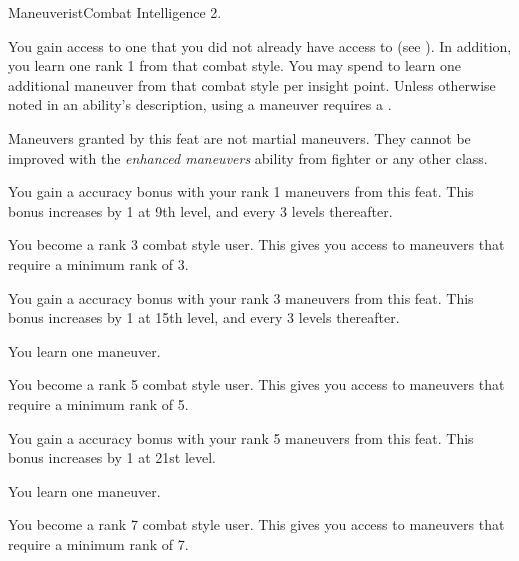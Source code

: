     \begin{feat}{Maneuverist}{Combat}
        \featpre Intelligence 2.

         You gain access to one  that you did not already have access to (see ).
        In addition, you learn one rank 1  from that combat style.
        You may spend  to learn one additional maneuver from that combat style per insight point.
        Unless otherwise noted in an ability's description, using a maneuver requires a .

        Maneuvers granted by this feat are not martial maneuvers.
        They cannot be improved with the \textit{enhanced maneuvers} ability from fighter or any other class.

         You gain a  accuracy bonus with your rank 1 maneuvers from this feat.
        This bonus increases by 1 at 9th level, and every 3 levels thereafter.

         You become a rank 3 combat style user.
        This gives you access to maneuvers that require a minimum rank of 3.

         You gain a  accuracy bonus with your rank 3 maneuvers from this feat.
        This bonus increases by 1 at 15th level, and every 3 levels thereafter.

         You learn one maneuver.

         You become a rank 5 combat style user.
        This gives you access to maneuvers that require a minimum rank of 5.

         You gain a  accuracy bonus with your rank 5 maneuvers from this feat.
        This bonus increases by 1 at 21st level.

         You learn one maneuver.

         You become a rank 7 combat style user.
        This gives you access to maneuvers that require a minimum rank of 7.
    \end{feat}

